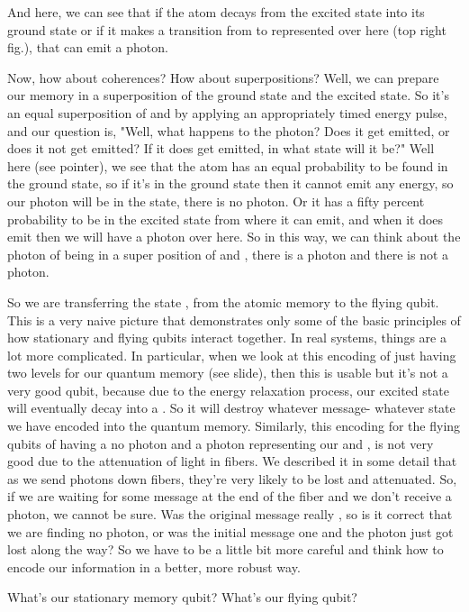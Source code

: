 And here, we can see that if the atom decays from the excited state into its ground state or if it makes a transition from  to  represented over here (top right fig.), that can emit a photon.

Now, how about coherences? How about superpositions? Well, we can prepare our memory in a superposition of the ground state and the excited state. So it's an equal superposition of  and  by applying an appropriately timed energy pulse, and our question is, "Well, what happens to the photon? Does it get emitted, or does it not get emitted? If it does get emitted, in what state will it be?" Well here (see pointer), we see that the atom has an equal probability to be found in the ground state, so if it's in the ground state then it cannot emit any energy, so our photon will be in the  state, there is no photon. Or it has a fifty percent probability to be in the excited state from where it can emit, and when it does emit then we will have a photon over here. So in this way, we can think about the photon of being in a super position of  and , there is a photon and there is not a photon.

So we are transferring the state \ket{+}, from the atomic memory to the flying qubit. This is a very naive picture that demonstrates only some of the basic principles of how stationary and flying qubits interact together. In real systems, things are a lot more complicated. In particular, when we look at this encoding of just having two levels for our quantum memory (see slide), then this is usable but it's not a very good qubit, because due to the energy relaxation process, our excited state will eventually decay into a . So it will destroy whatever message- whatever state we have encoded into the quantum memory. Similarly, this encoding for the flying qubits of having a no photon and a photon representing our  and , is not very good due to the attenuation of light in fibers. We described it in some detail that as we send photons down fibers, they're very likely to be lost and attenuated. So, if we are waiting for some message at the end of the fiber and we don't receive a photon, we cannot be sure. Was the original message really , so is it correct that we are finding no photon, or was the initial message one and the photon just got lost along the way? So we have to be a little bit more careful and think how to encode our information in a better, more robust way.

What's our stationary memory qubit? What's our flying qubit?

